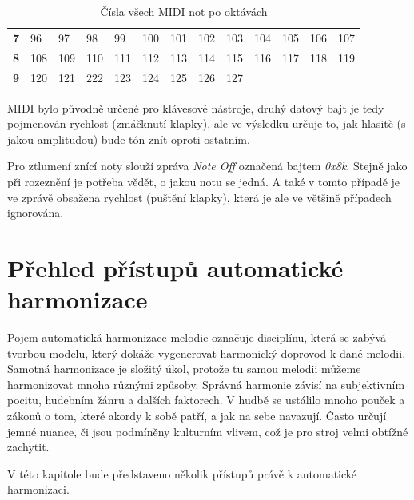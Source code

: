 \begin{table}[]
\begin{tabular}{l|llllllllllll}
        \textbf{7}                       & 96         & 97           & 98         & 99           & 100        & 101        & 102          & 103        & 104          & 105        & 106          & 107        \\
        \textbf{8}                       & 108        & 109          & 110        & 111          & 112        & 113        & 114          & 115        & 116          & 117        & 118          & 119        \\
        \textbf{9}                       & 120        & 121          & 222        & 123          & 124        & 125        & 126          & 127        & \multicolumn{4}{l}{}                                 
    \end{tabular}
    \caption{Čísla všech MIDI not po oktávách \cite{Back_SMF_Specif}}
    \label{tableMIDINotes}
\end{table}

MIDI bylo původně určené pro klávesové nástroje, 
druhý datový bajt je tedy pojmenován rychlost (zmáčknutí klapky),
ale ve výsledku určuje to, jak hlasitě (s jakou amplitudou) bude tón znít oproti ostatním.

Pro ztlumení znící noty slouží zpráva \emph{Note Off} označená bajtem \emph{0x8k}.
Stejně jako při rozeznění je potřeba vědět, o jakou notu se jedná.
A také v tomto případě je ve zprávě obsažena rychlost (puštění klapky), 
která je ale ve většině případech ignorována.
\cite{MIDI_tutorials}

\chapter{Přehled přístupů automatické harmonizace}
Pojem automatická harmonizace melodie označuje disciplínu, která se zabývá tvorbou modelu, 
který dokáže vygenerovat harmonický doprovod k dané melodii.
Samotná harmonizace je složitý úkol, 
protože tu samou melodii můžeme harmonizovat mnoha různými způsoby.
Správná harmonie závisí na subjektivním pocitu, hudebním žánru a dalších faktorech.
V hudbě se ustálilo mnoho pouček a zákonů o tom, které akordy k sobě patří,
a jak na sebe navazují.
Často určují jemné nuance, či jsou podmíněny kulturním vlivem, 
což je pro stroj velmi obtížné zachytit.
\cite{YinCheng_comparativeStudy}
\par

V této kapitole bude představeno několik přístupů právě k automatické harmonizaci.

